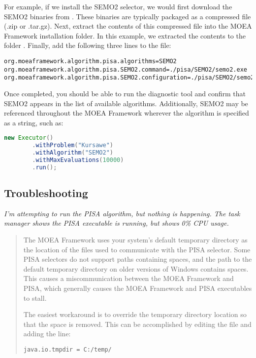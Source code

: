 For example, if we install the SEMO2 selector, we would first download the SEMO2 binaries from .  These binaries are typically packaged as a compressed file (.zip or .tar.gz).  Next, extract the contents of this compressed file into the MOEA Framework installation folder.  In this example, we extracted the contents to the folder .  Finally, add the following three lines to the  file:

\begin{lstlisting}[language=Plaintext]
org.moeaframework.algorithm.pisa.algorithms=SEMO2
org.moeaframework.algorithm.pisa.SEMO2.command=./pisa/SEMO2/semo2.exe
org.moeaframework.algorithm.pisa.SEMO2.configuration=./pisa/SEMO2/semo2_params.txt
\end{lstlisting}

Once completed, you should be able to run the diagnostic tool and confirm that SEMO2 appears in the list of available algorithms.  Additionally, SEMO2 may be referenced throughout the MOEA Framework wherever the algorithm is specified as a string, such as:

\begin{lstlisting}[language=Java]
new Executor()
		.withProblem("Kursawe")
		.withAlgorithm("SEMO2")
		.withMaxEvaluations(10000)
		.run();
\end{lstlisting}

\subsection{Troubleshooting}

\noindent
\textit{I'm attempting to run the PISA algorithm, but nothing is happening.  The task manager shows the PISA executable is running, but shows 0\% CPU usage.}

\begin{quote}
The MOEA Framework uses your system's default temporary directory as the location of the files used to communicate with the PISA selector.  Some PISA selectors do not support paths containing spaces, and the path to the default temporary directory on older versions of Windows contains spaces.  This causes a miscommunication between the MOEA Framework and PISA, which generally causes the MOEA Framework and PISA executables to stall.

The easiest workaround is to override the temporary directory location so that the space is removed.  This can be accomplished by editing the  file and adding the line:

\begin{lstlisting}[language=Plaintext]
java.io.tmpdir = C:/temp/
\end{lstlisting}
\end{quote}


